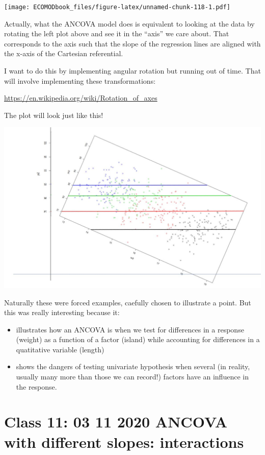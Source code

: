 \documentclass[
]{book}
\providecommand{\tightlist}{%
  \setlength{\itemsep}{0pt}\setlength{\parskip}{0pt}}
\begin{document}
\texttt{[image: ECOMODbook\_files/figure-latex/unnamed-chunk-118-1.pdf]}

Actually, what the ANCOVA model does is equivalent to looking at the data by rotating the left plot above and see it in the ``axis'' we care about. That corresponds to the axis such that the slope of the regression lines are aligned with the x-axis of the Cartesian referential.

I want to do this by implementing angular rotation but running out of time. That will involve implementing these transformations:

\url{https://en.wikipedia.org/wiki/Rotation_of_axes}

The plot will look just like this!

\includegraphics{FigPlotRotatedAula10.JPG}

Naturally these were forced examples, caefully chosen to illustrate a point. But this was really interesting because it:

\begin{itemize}
\tightlist
\item
  illustrates how an ANCOVA is when we test for differences in a response (weight) as a function of a factor (island) while accounting for differences in a quatitative variable (length)
\item
  shows the dangers of testing univariate hypothesis when several (in reality, usually many more than those we can record!) factors have an influence in the response.
\end{itemize}

\hypertarget{aula11}{%
\chapter{Class 11: 03 11 2020 ANCOVA with different slopes: interactions}\label{aula11}}
\end{document}
